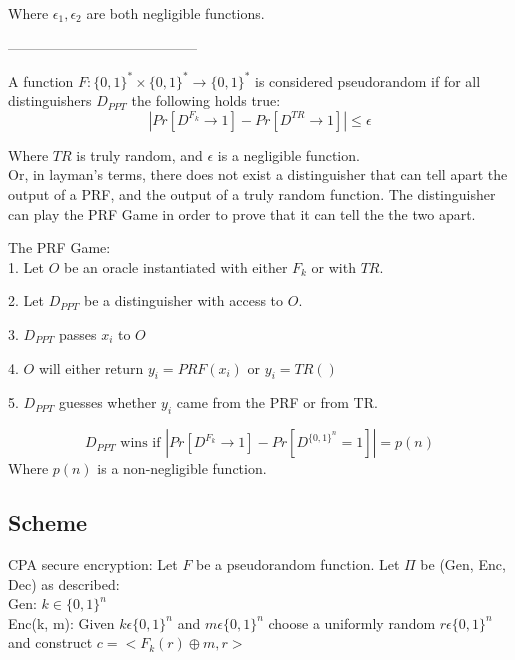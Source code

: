 \documentclass[11pt]{article}
\begin{document}
Where $\epsilon_1, \epsilon_2$ are both negligible functions.


-----------------------------------------

A function $F: \{0,1\}^* \times \{0,1\}^* \rightarrow \{0,1\}^*$ is considered pseudorandom if for all distinguishers $D_{PPT}$ the following holds true:\\

$$|Pr[D^{F_k}\rightarrow 1] - Pr[D^{TR}\rightarrow1]| \leq \epsilon$$

Where $TR$ is truly random, and $\epsilon$ is a negligible function.\\

Or, in layman's terms, there does not exist a distinguisher that can tell apart the output of a PRF, and the output of a truly random function. The distinguisher can play the PRF Game in order to prove that it can tell the the two apart.


The PRF Game:\\

\hspace{\parindent} 1. Let $O$ be an oracle instantiated with either $F_k$ or with $TR$.

\hspace{\parindent} 2. Let $D_{PPT}$ be a distinguisher with access to $O$.

\hspace{\parindent} 3. $D_{PPT}$ passes $x_i$ to $O$

\hspace{\parindent} 4. $O$ will either return $y_i = PRF(x_i)$ or $y_i = TR()$

\hspace{\parindent} 5. $D_{PPT}$ guesses whether $y_i$ came from the PRF or from TR.


$$D_{PPT} \textrm{ wins if }|Pr[D^{F_k}\rightarrow 1] - Pr[D^{\{0,1\}^n}=1]| = p(n)$$
Where $p(n)$ is a non-negligible function.


\subsection*{Scheme}
CPA secure encryption: 
Let $F$ be a pseudorandom function. Let $\Pi$ be (Gen, Enc, Dec) as described:\\

\hspace{\parindent} Gen: $k \in \{0,1\}^n$\\

\hspace{\parindent} Enc(k, m): Given $k \epsilon \{0,1\}^n$ and $m \epsilon \{0,1\}^n$ choose a uniformly random $r \epsilon \{0,1\}^n$ and construct $c = <F_k(r)\oplus m, r>$\\
\end{document}
